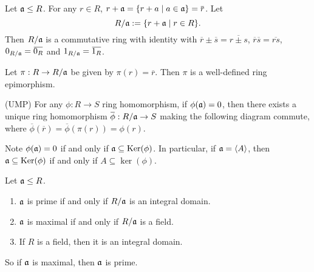\begin{construction}
    Let $\mathfrak{a} \leq R$. For any $r \in R$, $r+\ffa = \{r + a \mid a \in \ffa\} = \overbar r$. Let 
    \[R/\mathfrak{a} := \{r + \mathfrak{a} \mid r \in R\}.\] 
    Then $R/\mathfrak{a}$ is a commutative ring with identity with $\overbar r \pm \overbar s = \overbar {r \pm s}$, $\overbar r \overbar s = \overbar{rs}$, $0_{R/\ffa} = \overbar {0_R}$ and $1_{R/\ffa} = \overbar {1_R}$. \par
    Let $\pi: R \to R/\mathfrak{a}$ be given by $\pi(r) = \overbar r$. Then $\pi$ is a well-defined ring epimorphism. \par 
    (UMP) For any $\phi: R \to S$ ring homomorphism, if $\phi(\mathfrak{a}) = 0$, then there exists a unique ring homomorphism $\overbar \phi: R/\ffa \to S$ making the following diagram commute, where $\overbar \phi(\overbar r) = \overbar \phi (\pi(r)) = \phi(r)$. 
    \begin{center}
    \end{center}
    \par
    Note $\phi(\mathfrak{a}) = 0$ if and only if $\mathfrak{a} \subseteq \operatorname{Ker}(\phi)$. In particular, if $\mathfrak{a} = \langle A \rangle$, then $\mathfrak{a} \subseteq \operatorname{Ker}(\phi)$ if and only if $A \subseteq \ker(\phi)$.
\end{construction}

\begin{fact}
    Let $\mathfrak{a} \leq R$. 
    \begin{enumerate}
        \item $\mathfrak{a}$ is prime if and only if $R/\mathfrak{a}$ is an integral domain.
        \item $\mathfrak{a}$ is maximal if and only if $R/\mathfrak{a}$ is a field.
        \item If $R$ is a field, then it is an integral domain. 
    \end{enumerate}
    So if $\mathfrak{a}$ is maximal, then $\mathfrak{a}$ is prime.
\end{fact}

